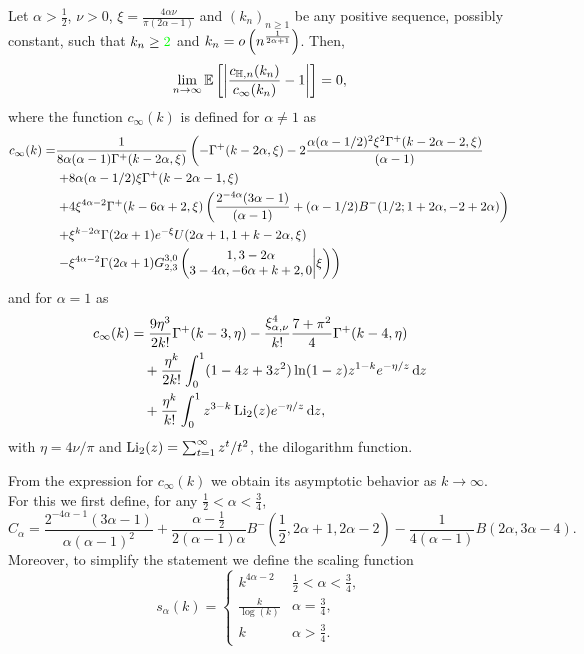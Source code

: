 \begin{theorem}
\label{thm:local_clustering_hyperbolic}
Let $\alpha > \frac{1}{2}$, $\nu > 0$, $\xi = \frac{4\alpha\nu}{\pi(2\alpha-1)}$ and $(k_n)_{n \ge 1}$ be any positive sequence, possibly constant, such that $k_n \ge \GR{2}$ and $k_n = \smallO{n^{\frac{1}{2\alpha + 1}}}$. Then, 
\[
	\lim_{n \to \infty} \Exp{\left|\frac{c_{\H,n}(k_n)}{c_\infty(k_n)} - 1\right|} = 0,
\]
where the function $c_\infty(k)$ is defined for $\alpha \ne 1$ as
\begin{align*}
c_\infty(k)  =&\frac{1}{8\alpha (\alpha-1)\Gamma^+(k-2\alpha,\xi)} \left( -\Gamma^+(k - 2 \alpha, \xi) - 2\frac{\alpha (\alpha - 1/2)^2 \xi^{2} \Gamma^+(k - 2 \alpha - 2, \xi)}{(\alpha - 1)} \right. \\ 
&\left.+ 8 \alpha (\alpha - 1/2) \xi \Gamma^+(k - 2 \alpha - 1,\xi) \right.\\ 
&\left.+ 4\xi^{4\alpha - 2} \Gamma^+(k - 6 \alpha + 2, 
      \xi) \left( \frac{2^{ - 4\alpha}(3 \alpha - 1)}{(\alpha - 1)} + (\alpha - 1/2) B^-(1/2; 1 + 2 \alpha, -2 + 2 \alpha) \right)  \right.\\ 
&\left.+ \xi^{k-2\alpha} \Gamma(2\alpha+1)e^{-\xi} U(2\alpha+1,1+k-2\alpha,\xi) \right. \\ 
&\left.- \xi^{4\alpha-2} \Gamma(2\alpha+1)\MeijerG{3}{0}{2}{3}{1,3-2\alpha}{3-4\alpha,-6\alpha+k+2,0}{\xi}  \right)
\end{align*}
and for $\alpha = 1$ as
\begin{align*}
	c_\infty(k) &= \frac{9 \eta^3}{2 k!} 	
		\Gamma^+(k-3,\eta)-\frac{\xi_{\alpha,\nu}^4}{k!}\frac{7+\pi^2}{4}\Gamma^+(k-4,\eta)\\
	&\hspace{10pt}+ \frac{\eta^k}{2k!}\int_0^1 (1-4z+3z^2)\ln(1-z)z^{1-k}e^{-\eta/z}\dd z\\ 
	&\hspace{10pt}+ \frac{\eta^k}{k!}\int_0^1 z^{3-k} \Li_2(z) e^{-\eta/z} \dd z,
\end{align*}
with $\eta = 4\nu/\pi$ and $\Li_2(z) = \sum_{t = 1}^\infty z^t/t^2$, the dilogarithm function.
\end{theorem}

From the expression for $c_\infty(k)$ we obtain its asymptotic behavior as $k \to \infty$. For this we first define, for any $\frac{1}{2} < \alpha < \frac{3}{4}$,
\begin{equation}\label{eq:def_C_alpha}
	C_\alpha = \frac{2^{-4\alpha - 1}(3\alpha - 1)}{\alpha(\alpha-1)^2} 
	+ \frac{\alpha - \frac{1}{2}}{2(\alpha - 1)\alpha} B^-(\frac{1}{2},2\alpha + 1, 2\alpha - 2)
	- \frac{1}{4(\alpha - 1)}B(2\alpha, 3\alpha - 4).
\end{equation}
Moreover, to simplify the statement we define the scaling function 
\begin{equation}\label{eq:def_scaling_function}
s_\alpha(k) = \begin{cases} 
		k^{4\alpha-2} &\frac{1}{2}<\alpha<\frac{3}{4}, \\
		\frac{k}{\log(k)} & \alpha = \frac{3}{4}, \\
		k &\alpha > \frac{3}{4}.
\end{cases}
\end{equation}

